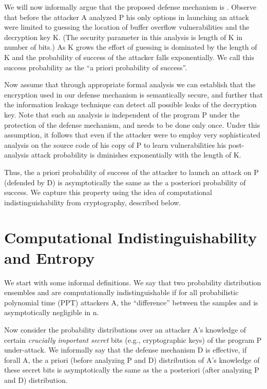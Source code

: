   We will now informally argue that the proposed defense mechanism is
  \resistant. Observe that before the attacker A analyzed P his only
  options in launching an attack were limited to guessing the location
  of buffer overflow vulnerabilities and the decryption key K. (The
  security parameter in this analysis is length of K in number of
  bits.) As K grows the effort of guessing is dominated by the length
  of K and the probability of success of the attacker falls
  exponentially. We call this success probability as the ``a priori
  probability of success''. 

  Now assume that through appropriate formal analysis we can establish
  that the encryption used in our defense mechanism is semantically
  secure, and further that the information leakage technique can
  detect all possible leaks of the decryption key. Note that such an
  analysis is independent of the program P under the protection of the
  defense mechanism, and needs to be done only once. Under this
  assumption, it follows that even if the attacker were to employ very
  sophisticated analysis on the source code of his copy of P to learn
  vulnerabilities his post-analysis attack probability is dminishes
  exponentially with the length of K. 

  Thus, the a priori probability of success of the attacker to launch
  an attack on P (defended by D) is asymptotically the same as the a
  posteriori probability of success. We capture this \resistance
  property using the idea of computational indistinguishability from
  cryptography, described below.

  \section{Computational Indistinguishability and Entropy}

  We start with some informal definitions. We say that two probability
  distribution ensembles  and  are computationally
  indistinguishable if for all probabilistic polynomial time (PPT)
  attackers A, the ``difference'' between the samples  and 
  is asymptotically negligible in n.

  Now consider the probability distributions over an attacker A's
  knowledge of certain {\it crucially important secret} bits (e.g.,
  cryptographic keys) of the program P under-attack. We informally say
  that the defense mechanism D is effective, if forall A, the a priori
  (before analyzing P and D) distribution of A's knowledge of these
  secret bits is asymptotically the same as the a posteriori (after
  analyzing P and D) distribution.

